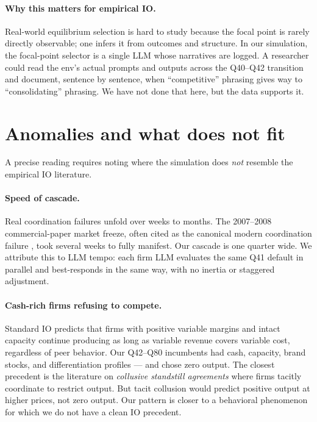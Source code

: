 \documentclass[11pt]{article}
\begin{document}
\paragraph{Why this matters for empirical IO.} Real-world equilibrium selection is hard to study because the focal point is rarely directly observable; one infers it from outcomes and structure. In our simulation, the focal-point selector is a single LLM whose narratives are logged. A researcher could read the env's actual prompts and outputs across the Q40--Q42 transition and document, sentence by sentence, when ``competitive'' phrasing gives way to ``consolidating'' phrasing. We have not done that here, but the data supports it.

\section{Anomalies and what does not fit}\label{sec:anomalies}

A precise reading requires noting where the simulation does \emph{not} resemble the empirical IO literature.

\paragraph{Speed of cascade.} Real coordination failures unfold over weeks to months. The 2007--2008 commercial-paper market freeze, often cited as the canonical modern coordination failure \citep{Brunnermeier2009}, took several weeks to fully manifest. Our cascade is one quarter wide. We attribute this to LLM tempo: each firm LLM evaluates the same Q41 default in parallel and best-responds in the same way, with no inertia or staggered adjustment.

\paragraph{Cash-rich firms refusing to compete.} Standard IO predicts that firms with positive variable margins and intact capacity continue producing as long as variable revenue covers variable cost, regardless of peer behavior. Our Q42--Q80 incumbents had cash, capacity, brand stocks, and differentiation profiles --- and chose zero output. The closest precedent is the literature on \emph{collusive standstill agreements} \citep{Tirole1988,FudenbergMaskin1986} where firms tacitly coordinate to restrict output. But tacit collusion would predict positive output at higher prices, not zero output. Our pattern is closer to a behavioral phenomenon for which we do not have a clean IO precedent.
\end{document}
